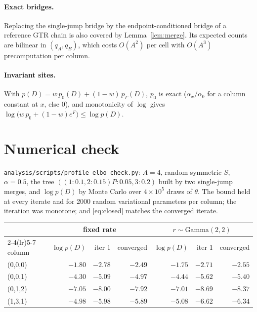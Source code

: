 \documentclass[11pt]{article}
\newcommand{\Gam}{\mathrm{Gamma}}
\begin{document}
\paragraph{Exact bridges.} Replacing the single-jump bridge by the
endpoint-conditioned bridge of a reference GTR chain is also covered by
Lemma~\ref{lem:merge}. Its expected counts are bilinear in $(q_A,q_B)$, which
costs $O(A^2)$ per cell with $O(A^3)$ precomputation per column.

\paragraph{Invariant sites.} With $p(D)=w\,p_0(D)+(1-w)\,p_\Gamma(D)$, $p_0$ is
exact ($\alpha_x/\alpha_0$ for a column constant at $x$, else $0$), and
monotonicity of $\log$ gives
$\log\big(w\,p_0+(1-w)e^{F}\big)\le\log p(D)$.

\section{Numerical check}
\label{sec:numcheck}

\texttt{analysis/scripts/profile\_elbo\_check.py}: $A=4$, random symmetric $S$,
$\alpha=0.5$, the tree $((1{:}0.1,2{:}0.15)P{:}0.05,3{:}0.2)$ built by two
single-jump merges, and $\log p(D)$ by Monte Carlo over $4\times10^5$ draws of
$\theta$. The bound held at every iterate and for 2000 random variational
parameters per column; the iteration was monotone; and \eqref{eq:closed}
matches the converged iterate.

\begin{center}
\begin{tabular}{lrrrrrr}
\toprule
& \multicolumn{3}{c}{fixed rate} & \multicolumn{3}{c}{$r\sim\Gam(2,2)$}\\
\cmidrule(lr){2-4}\cmidrule(lr){5-7}
column & $\log p(D)$ & iter 1 & converged & $\log p(D)$ & iter 1 & converged\\
\midrule
(0,0,0) & $-1.80$ & $-2.78$ & $-2.49$ & $-1.75$ & $-2.71$ & $-2.55$\\
(0,0,1) & $-4.30$ & $-5.09$ & $-4.97$ & $-4.44$ & $-5.62$ & $-5.40$\\
(0,1,2) & $-7.05$ & $-8.00$ & $-7.92$ & $-7.01$ & $-8.69$ & $-8.37$\\
(1,3,1) & $-4.98$ & $-5.98$ & $-5.89$ & $-5.08$ & $-6.62$ & $-6.34$\\
\bottomrule
\end{tabular}
\end{center}
\end{document}

